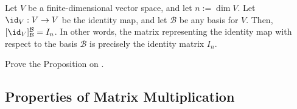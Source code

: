 \begin{proposition*}
\label{prop:identity_represents_id}
Let $V$ be a finite-di\-men\-sional vector space, and let $n := \dim V$. Let $\id_V: V \to V$ be the identity map, and let $\mathcal{B}$ be any basis for $V$. Then, $[\id_V]_{\mathcal{B}}^{\mathcal{B}} = I_n$. In other words, the matrix representing the identity map with respect to the basis $\mathcal{B}$ is precisely the identity matrix $I_n$.
\end{proposition*}

\begin{exercise}
\label{exc:identity_represents_id}
Prove the Proposition on .
\end{exercise}

\subsection{Properties of Matrix Multiplication}


